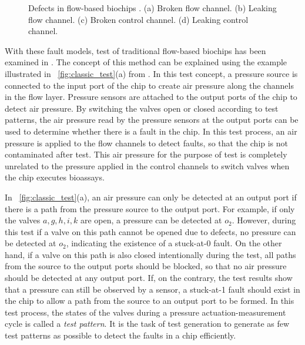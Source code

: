 \begin{figure}[t]
{\figurefontsize
\centering

\caption{Defects in flow-based biochips \cite{HuYHC14}. (a)
Broken flow channel. (b) Leaking flow channel. (c) Broken control channel. (d)
Leaking control channel.}
\label{fig:defects}
}
\end{figure}

With these fault models, test of traditional flow-based biochips has been
examined in \cite{HuYHC14}. The concept of this method can be explained
using the example illustrated in \figname~\ref{fig:classic_test}(a) from
\cite{HuYHC14}. In this test concept, a pressure source is connected to the
input port of the chip to create air pressure along the channels in the flow
layer. Pressure sensors are attached to the output ports of the chip to detect air
pressure. By switching the valves open or closed according to test patterns,
the air pressure read by the pressure sensors 
at the output ports can be used to determine whether
there is a fault in the chip. In this test process, an air pressure is applied
to the flow channels to detect faults, so that the chip is not
contaminated after test. This air pressure for the purpose of test 
is completely unrelated to the pressure applied in the control channels to 
switch valves when the chip executes bioassays.

In \figname~\ref{fig:classic_test}(a), an air pressure can only be detected at
an output port if there is a path from the pressure source to the output port. For example,
if only the valves $a, g, h, i, k$ are open,  a pressure can be detected
at $o_2$. However, during this test if a valve on this path cannot be opened due to
defects, no pressure can be detected at $o_2$, indicating the
existence of a stuck-at-0 fault. On the other hand, if a valve on this path is also
closed intentionally during the test, all paths from the source to the output
ports should be blocked,
so that no air pressure should be detected at any output port. If, on the
contrary, the test results show that a pressure can still be observed by a
sensor, a stuck-at-1 fault should exist in the chip to allow a path from the
source to an output port to be formed. In this test process,   
the states of the valves during a pressure actuation-measurement cycle is
called a \textit{test pattern}. It is the task of test generation to generate
as few test patterns as possible to detect the faults in a chip efficiently.


